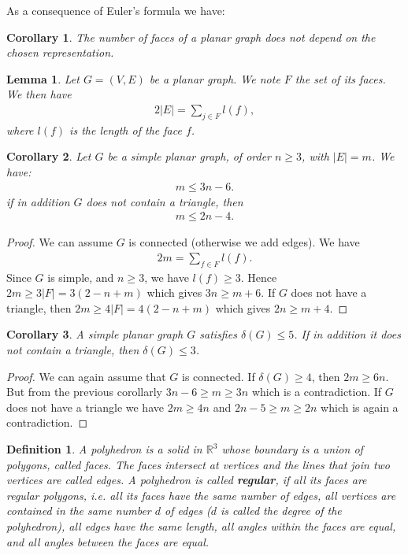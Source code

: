 \documentclass[12pt,a4paper]{article}
\newtheorem{lem}{Lemma}[section]
\newtheorem{cor}{Corollary}[section]
\newtheorem{defn}{Definition}[section]
\theoremstyle{definition}
\begin{document}
As a consequence of Euler's formula we have:
\begin{cor} The number of faces of a planar graph does not depend on the chosen representation. 
\end{cor} 
\newpage
\begin{lem} Let $G=(V,E)$ be a planar graph. We note $F$ the set of its faces. We then have 
\begin{align*}
2|E|= \sum_{j \in F} l(f),
\end{align*}
where $l(f)$ is the length of the face $f$. 
\end{lem}
\begin{cor} Let $G$ be a simple planar graph, of order $n \geq 3$, with $|E|=m$. We have: 
\begin{align*}
m \leq 3n-6.
\end{align*}
if in addition $G$ does not contain a triangle, then 
\begin{align*}
m \leq 2n-4.
\end{align*}
\end{cor}
\begin{proof}
We can assume $G$ is connected (otherwise we add edges). We have
\begin{align*}
2m= \sum_{f \in F} l(f).
\end{align*}
Since $G$ is simple, and $n \geq 3$, we have $l(f) \geq 3$. Hence $2m \geq 3 |F| = 3(2-n+m)$ which gives $3n \geq m+6$. If $G$ does not have a triangle, then $2m \geq 4|F|=4(2-n+m)$ which gives $2n \geq m+4$.
\end{proof}
\begin{cor}\label{lastcor} A simple planar graph $G$ satisfies $\delta(G) \leq 5$. If in addition it does not contain a triangle, then $\delta(G) \leq 3$. 
\end{cor}
\begin{proof}
We can again assume that $G$ is connected. If $\delta(G) \geq 4$, then $2m \geq 6n$. But from the previous corollarly $3n-6 \geq m \geq 3n$ which is a contradiction. If $G$ does not have a triangle we have $2m \geq 4n$ and $2n-5 \geq m \geq 2n$ which is again a contradiction. 
\end{proof}
\begin{defn} A polyhedron is a solid in $\mathbb{R}^3$ whose boundary is a union of polygons, called faces. The faces intersect at vertices and the lines that join two vertices are called edges. A polyhedron is called \textbf{regular}, if all its faces are regular polygons, i.e.  all its faces have the same number of edges, all vertices are contained in the same number $d$ of edges ($d$ is called the degree of the polyhedron), all edges have the same length, all angles within the faces are equal, and all angles between the faces are equal. 
\end{defn}
\end{document}
